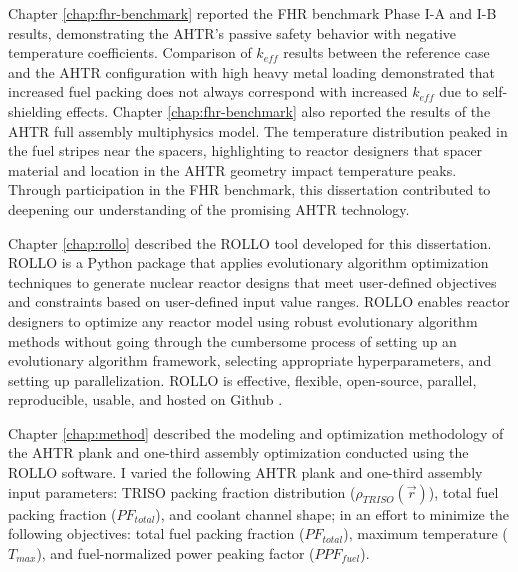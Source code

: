 Chapter \ref{chap:fhr-benchmark} reported the \gls{FHR} benchmark Phase I-A and I-B 
results, demonstrating the \gls{AHTR}'s passive safety behavior with 
negative temperature coefficients. 
Comparison of $k_{eff}$ results between the reference case and the \gls{AHTR} 
configuration with high heavy metal loading demonstrated that increased fuel 
packing does not always correspond with increased $k_{eff}$ due to self-shielding 
effects.
Chapter \ref{chap:fhr-benchmark} also reported the results of the \gls{AHTR} full 
assembly multiphysics model. The temperature distribution peaked in the fuel stripes near 
the spacers, highlighting to reactor designers that spacer material and location in the 
\gls{AHTR} geometry impact temperature peaks.  
Through participation in the \gls{FHR} benchmark, this dissertation contributed to 
deepening our understanding of the promising \gls{AHTR} technology. 

Chapter \ref{chap:rollo} described the \gls{ROLLO} tool developed for this 
dissertation. 
\gls{ROLLO} is a Python package that applies evolutionary algorithm 
optimization techniques to generate nuclear reactor designs that meet user-defined 
objectives and constraints based on user-defined input value ranges. 
\gls{ROLLO} enables reactor designers to optimize any reactor model using robust 
evolutionary algorithm methods without going through the cumbersome process of setting up 
an evolutionary algorithm framework, selecting appropriate hyperparameters, and 
setting up parallelization.
\gls{ROLLO} is effective, flexible, open-source, parallel, reproducible, usable, and 
hosted on Github \cite{chee_rollo_2021}. 

Chapter \ref{chap:method} described the modeling and optimization methodology of the 
\gls{AHTR} plank and one-third assembly optimization conducted using the \gls{ROLLO} 
software.
I varied the following \gls{AHTR} plank and one-third assembly input parameters: 
\gls{TRISO} packing fraction distribution ($\rho_{TRISO}(\vec{r})$), total fuel 
packing fraction ($PF_{total}$), and coolant channel shape; in an effort to minimize 
the following objectives: total fuel packing fraction ($PF_{total}$), maximum 
temperature ($T_{max}$), and fuel-normalized power peaking factor ($PPF_{fuel}$). 

